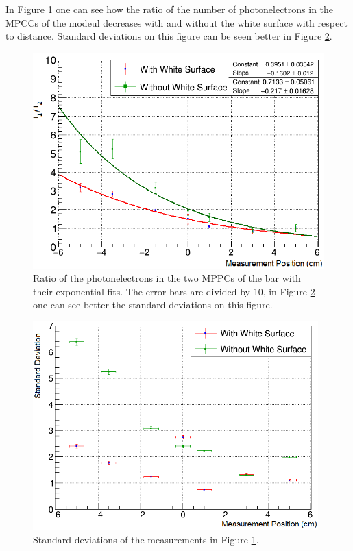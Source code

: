 \documentclass[a4paper]{article}\linespread{1.4}
\begin{document}
In Figure \ref{fig:s0os1} one can see how the ratio of the number of photonelectrons in the MPCCs of the modeul decreases with and without the white surface with respect to distance. Standard deviations on this figure can be seen better in Figure \ref{fig:s0os1e}.
\begin{figure}[] \centering \includegraphics[width=120mm,scale=1.0]{s0os1.png} \caption{Ratio of the photonelectrons in the two MPPCs of the bar with their exponential fits. The error bars are divided by 10, in Figure \ref{fig:s0os1e} one can see better the standard deviations on this figure.} \label{fig:s0os1} \end{figure}  
\begin{figure}[] \centering \includegraphics[width=110mm,scale=1.0]{s0os1e.png} \caption{ Standard deviations of the measurements in Figure \ref{fig:s0os1}.} \label{fig:s0os1e} \end{figure}  
\end{document}
